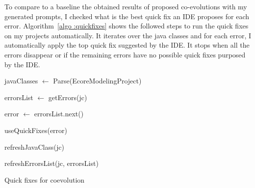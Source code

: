 To compare to a baseline the obtained results of proposed co-evolutions with my generated prompts, I checked what is the best quick fix an IDE proposes for each error. Algorithm~\ref{algo :quickfixes} shows the followed steps to run the quick fixes on my projects automatically. 
It iterates over the java classes and for each error, I  automatically apply the top quick fix suggested by the IDE. 
It stops when all the errors disappear or if the remaining errors have no possible quick fixes purposed by the IDE. 
\begin{algorithm}[t]
	\small
	\SetAlgoLined
	javaClasses $\leftarrow$ Parse(EcoreModelingProject)
	
	{
		errorsList $\leftarrow $ getErrors(jc)
		
		{
			error  $\leftarrow$ errorsList.next()
			
			
			{
				useQuickFixes(error) %
			}
			
			
			refreshJavaClass(jc) 
			
			refreshErrorsList(jc, errorsList)
		}
		
	}
	
	\caption{Quick fixes for coevolution}
	\label{algo :quickfixes}
\end{algorithm}


